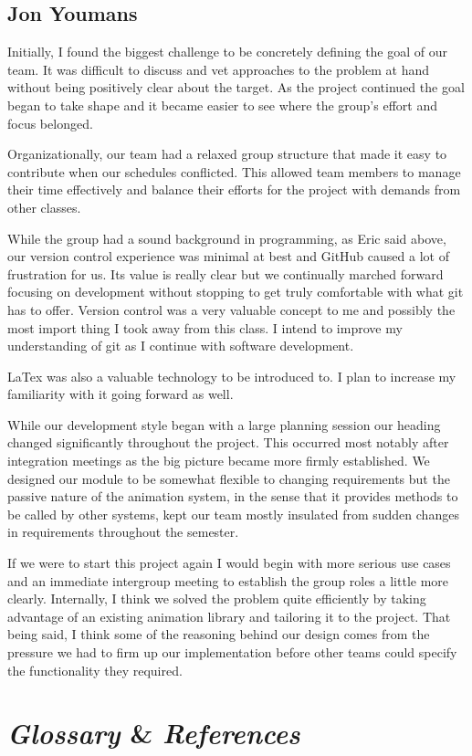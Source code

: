 \documentclass[12pt]{article}
\begin{document}
\subsection{Jon Youmans}
\begin{changemargin}{1cm}{0cm} 

Initially, I found the biggest challenge to be concretely defining the goal of our team. It was difficult to discuss and vet approaches to the problem at hand without being positively clear about the target. As the project continued the goal began to take shape and it became easier to see where the group's effort and focus belonged.

Organizationally, our team had a relaxed group structure that made it easy to contribute when our schedules conflicted. This allowed team members to manage their time effectively and balance their efforts for the project with demands from other classes.

While the group had a sound background in programming, as Eric said above, our version control experience was minimal at best and GitHub caused a lot of frustration for us. Its value is really clear but we continually marched forward focusing on development without stopping to get truly comfortable with what git has to offer. Version control was a very valuable concept to me and possibly the most import thing I took away from this class. I intend to improve my understanding of git as I continue with software development.

LaTex was also a valuable technology to be introduced to. I plan to increase my familiarity with it going forward as well.
    
While our development style began with a large planning session our heading changed significantly throughout the project. This occurred most notably after integration meetings as the big picture became more firmly established. We designed our module to be somewhat flexible to changing requirements but the passive nature of the animation system, in the sense that it provides methods to be called by other systems, kept our team mostly insulated from sudden changes in requirements throughout the semester.
    
If we were to start this project again I would begin with more serious use cases and an immediate intergroup meeting to establish the group roles a little more clearly. Internally, I think we solved the problem quite efficiently by taking advantage of an existing animation library and tailoring it to the project. That being said, I think some of the reasoning behind our design comes from the pressure we had to firm up our implementation before other teams could specify the functionality they required. 

\end{changemargin} 


\section{\emph{Glossary} \& \emph{References}}
	
\end{document}

